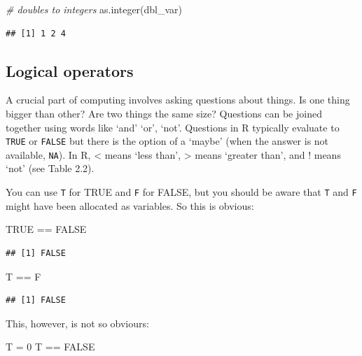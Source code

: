\documentclass[
]{book}
\newenvironment{Shaded}{\begin{snugshade}}{\end{snugshade}}
\newcommand{\CommentTok}[1]{\textcolor[rgb]{0.56,0.35,0.01}{\textit{#1}}}
\newcommand{\ConstantTok}[1]{\textcolor[rgb]{0.00,0.00,0.00}{#1}}
\newcommand{\DecValTok}[1]{\textcolor[rgb]{0.00,0.00,0.81}{#1}}
\newcommand{\FunctionTok}[1]{\textcolor[rgb]{0.00,0.00,0.00}{#1}}
\newcommand{\NormalTok}[1]{#1}
\newcommand{\OtherTok}[1]{\textcolor[rgb]{0.56,0.35,0.01}{#1}}
\newcommand{\SpecialCharTok}[1]{\textcolor[rgb]{0.00,0.00,0.00}{#1}}
\theoremstyle{definition}
\theoremstyle{definition}
\theoremstyle{definition}
\theoremstyle{definition}
\theoremstyle{remark}
\begin{document}
\begin{Shaded}
\begin{Highlighting}[]
\CommentTok{\# doubles to integers}
\FunctionTok{as.integer}\NormalTok{(dbl\_var)}
\end{Highlighting}
\end{Shaded}

\begin{verbatim}
## [1] 1 2 4
\end{verbatim}

\hypertarget{logical-operators}{%
\subsection{Logical operators}\label{logical-operators}}

A crucial part of computing involves asking questions about things. Is one thing bigger than other? Are two things the same size? Questions can be joined together using words like `and' `or', `not'. Questions in R typically evaluate to \texttt{TRUE} or \texttt{FALSE} but there is the option of a `maybe' (when the answer is not available, \texttt{NA}). In R, \textless{} means `less than', \textgreater{} means `greater than', and ! means `not' (see Table 2.2).

You can use \texttt{T} for TRUE and \texttt{F} for FALSE, but you should be aware that \texttt{T} and \texttt{F} might have been allocated
as variables. So this is obvious:

\begin{Shaded}
\begin{Highlighting}[]
\ConstantTok{TRUE} \SpecialCharTok{==} \ConstantTok{FALSE}
\end{Highlighting}
\end{Shaded}

\begin{verbatim}
## [1] FALSE
\end{verbatim}

\begin{Shaded}
\begin{Highlighting}[]
\NormalTok{T }\SpecialCharTok{==}\NormalTok{ F}
\end{Highlighting}
\end{Shaded}

\begin{verbatim}
## [1] FALSE
\end{verbatim}

This, however, is not so obviours:

\begin{Shaded}
\begin{Highlighting}[]
\NormalTok{T }\OtherTok{=} \DecValTok{0}
\NormalTok{T }\SpecialCharTok{==} \ConstantTok{FALSE}
\end{Highlighting}
\end{Shaded}
\end{document}
